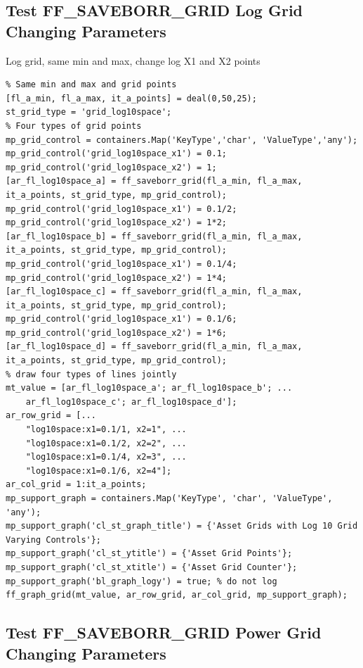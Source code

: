 \documentclass[
]{book}
\begin{document}
\hypertarget{test-ff_saveborr_grid-log-grid-changing-parameters}{%
\subsection{Test FF\_SAVEBORR\_GRID Log Grid Changing Parameters}\label{test-ff_saveborr_grid-log-grid-changing-parameters}}

Log grid, same min and max, change log X1 and X2 points

\begin{verbatim}
% Same min and max and grid points
[fl_a_min, fl_a_max, it_a_points] = deal(0,50,25);
st_grid_type = 'grid_log10space';
% Four types of grid points
mp_grid_control = containers.Map('KeyType','char', 'ValueType','any');
mp_grid_control('grid_log10space_x1') = 0.1;
mp_grid_control('grid_log10space_x2') = 1;
[ar_fl_log10space_a] = ff_saveborr_grid(fl_a_min, fl_a_max, it_a_points, st_grid_type, mp_grid_control);
mp_grid_control('grid_log10space_x1') = 0.1/2;
mp_grid_control('grid_log10space_x2') = 1*2;
[ar_fl_log10space_b] = ff_saveborr_grid(fl_a_min, fl_a_max, it_a_points, st_grid_type, mp_grid_control);
mp_grid_control('grid_log10space_x1') = 0.1/4;
mp_grid_control('grid_log10space_x2') = 1*4;
[ar_fl_log10space_c] = ff_saveborr_grid(fl_a_min, fl_a_max, it_a_points, st_grid_type, mp_grid_control);
mp_grid_control('grid_log10space_x1') = 0.1/6;
mp_grid_control('grid_log10space_x2') = 1*6;
[ar_fl_log10space_d] = ff_saveborr_grid(fl_a_min, fl_a_max, it_a_points, st_grid_type, mp_grid_control);
% draw four types of lines jointly
mt_value = [ar_fl_log10space_a'; ar_fl_log10space_b'; ...
    ar_fl_log10space_c'; ar_fl_log10space_d'];
ar_row_grid = [...
    "log10space:x1=0.1/1, x2=1", ...
    "log10space:x1=0.1/2, x2=2", ...
    "log10space:x1=0.1/4, x2=3", ...
    "log10space:x1=0.1/6, x2=4"];
ar_col_grid = 1:it_a_points;
mp_support_graph = containers.Map('KeyType', 'char', 'ValueType', 'any');
mp_support_graph('cl_st_graph_title') = {'Asset Grids with Log 10 Grid Varying Controls'};
mp_support_graph('cl_st_ytitle') = {'Asset Grid Points'};
mp_support_graph('cl_st_xtitle') = {'Asset Grid Counter'};
mp_support_graph('bl_graph_logy') = true; % do not log
ff_graph_grid(mt_value, ar_row_grid, ar_col_grid, mp_support_graph);
\end{verbatim}

\hypertarget{test-ff_saveborr_grid-power-grid-changing-parameters}{%
\subsection{Test FF\_SAVEBORR\_GRID Power Grid Changing Parameters}\label{test-ff_saveborr_grid-power-grid-changing-parameters}}
\end{document}
